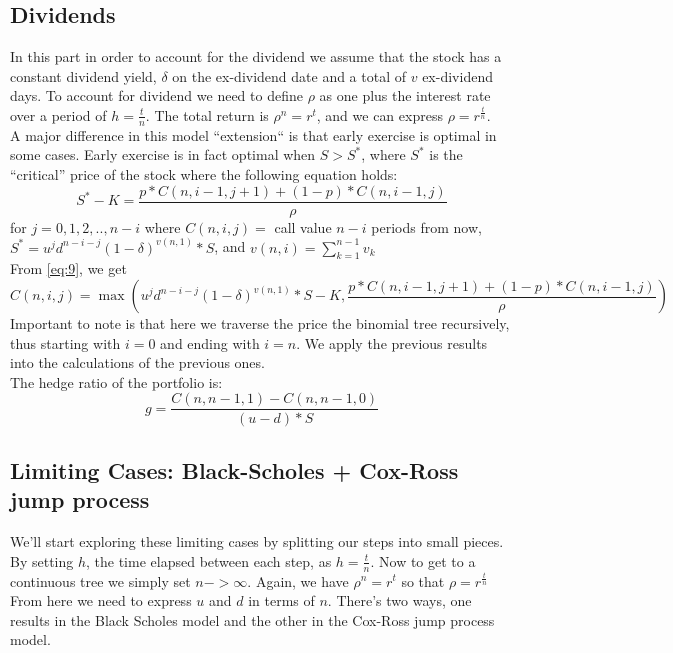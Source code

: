 \documentclass{article}
\DeclareMathOperator{\max}{max}
\begin{document}
\subsection{Dividends}
In this part in order to account for the dividend we assume that the stock has a constant dividend yield, $\delta$ on the ex-dividend date and a total of $v$ ex-dividend days. To account for dividend we need to define $\rho$ as one plus the interest rate over a period of $h=\frac{t}{n}$. The total return  is $\rho^{n} = r^{t}$, and we can express $\rho= r^{\frac{t}{n}}$. \\
A major difference in this model “extension“ is that early exercise is optimal in some cases. Early exercise is in fact optimal when $S > S^{*}$, where $S^{*}$ is the “critical” price of the stock where the following equation holds:
\begin{equation}\label{eq:9}
    S^{*} - K = \frac{p*C(n,i-1,j+1) + (1-p)*C(n,i-1,j)}{\rho}
\end{equation}
for $j = 0, 1, 2, .., n-i$ where $C(n, i, j) =$ call value $n-i$ periods from now, $S^{*} = u^{j}d^{n-i-j}(1-\delta)^{v(n,1)}*S$, and $v(n,i)=\sum_{k=1}^{n-1}v_{k}$ \\ [4ex]
From \ref{eq:9}, we get 
\begin{equation}\label{eq:10}
   C(n,i,j) = \max\left(u^{j}d^{n-i-j}(1-\delta)^{v(n,1)}*S - K, \frac{p*C(n,i-1,j+1) + (1-p)*C(n,i-1,j)}{\rho}\right)
\end{equation}
Important to note is that here we traverse the price the binomial tree recursively, thus starting with $i = 0$ and ending with $i = n$. We apply the previous results into the calculations of the previous ones. \\ [2ex]
The hedge ratio of the portfolio is:
\begin{equation*}
    g = \frac{C(n, n - 1, 1) - C(n, n -1, 0)}{(u - d) * S}
\end{equation*}
\subsection{Limiting Cases: Black-Scholes + Cox-Ross jump process}
We’ll start exploring these limiting cases by splitting our steps into small pieces. By setting $h$, the time elapsed between each step, as $h = \frac{t}{n}$. Now to get to a continuous tree we simply set $n -> \infty$. Again, we have $\rho^{n} = r^{t}$ so that $\rho = r^{\frac{t}{n}}$\\ [2ex]
From here we need to express $u$ and $d$ in terms of $n$. There’s two ways, one results in the Black Scholes model and the other in the Cox-Ross jump process model.
\end{document}
